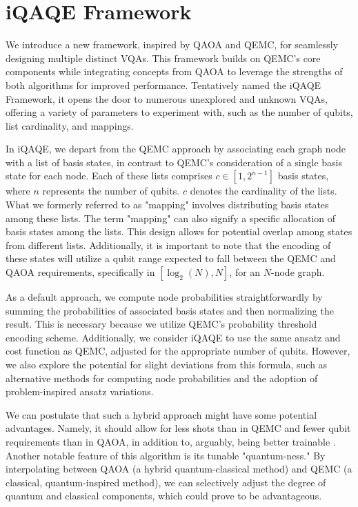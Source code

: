 \section{iQAQE Framework}
\label{sec: Methodology}

We introduce a new framework, inspired by QAOA and QEMC, for seamlessly designing multiple distinct VQAs. This framework builds on QEMC's core components while integrating concepts from QAOA to leverage the strengths of both algorithms for improved performance. Tentatively named the iQAQE Framework, it opens the door to numerous unexplored and unknown VQAs, offering a variety of parameters to experiment with, such as the number of qubits, list cardinality, and mappings.

In iQAQE, we depart from the QEMC approach by associating each graph node with a list of basis states, in contrast to QEMC's consideration of a single basis state for each node. Each of these lists comprises $c \in \left[1, 2^{n-1}\right]$ basis states, where $n$ represents the number of qubits. $c$ denotes the cardinality of the lists. What we formerly referred to as "mapping" involves distributing basis states among these lists. The term "mapping" can also signify a specific allocation of basis states among the lists. This design allows for potential overlap among states from different lists. Additionally, it is important to note that the encoding of these states will utilize a qubit range expected to fall between the QEMC and QAOA requirements, specifically in $[\log_2(N), N]$, for an $N$-node graph.

As a default approach, we compute node probabilities straightforwardly by summing the probabilities of associated basis states and then normalizing the result. This is necessary because we utilize QEMC's probability threshold encoding scheme. Additionally, we consider iQAQE to use the same ansatz and cost function as QEMC, adjusted for the appropriate number of qubits. However, we also explore the potential for slight deviations from this formula, such as alternative methods for computing node probabilities and the adoption of problem-inspired ansatz variations.

We can postulate that such a hybrid approach might have some potential advantages. Namely, it should allow for less shots than in QEMC and fewer qubit requirements than in QAOA, in addition to, arguably, being better trainable \cite{tenecohen2023variational}. Another notable feature of this algorithm is its tunable "quantum-ness." By interpolating between QAOA (a hybrid quantum-classical method) and QEMC (a classical, quantum-inspired method), we can selectively adjust the degree of quantum and classical components, which could prove to be advantageous.


